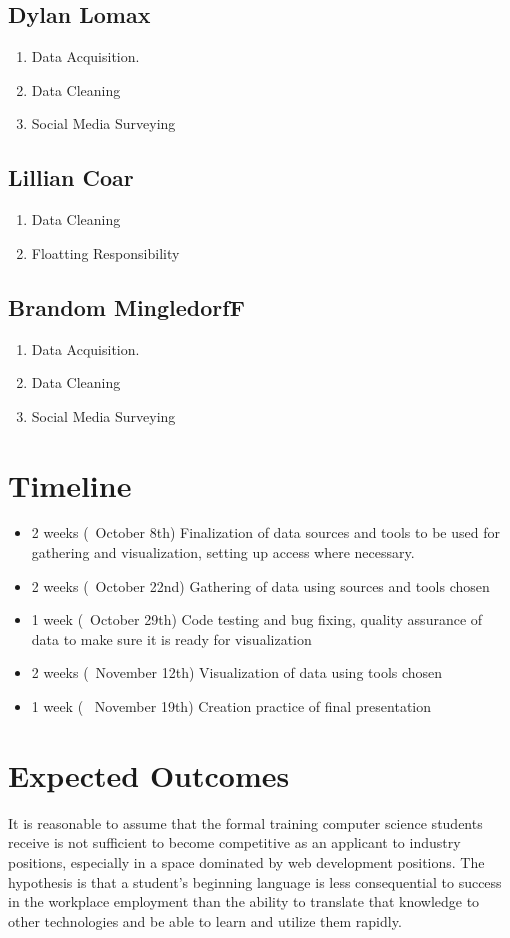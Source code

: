 \documentclass[letterpaper, 10 pt, conference]{ieeeconf}  %
\begin{document}
\subsection{Dylan Lomax}
\begin{enumerate}
    \item Data Acquisition.
    \item Data Cleaning
    \item Social Media Surveying
\end{enumerate}

\subsection{Lillian Coar}
\begin{enumerate}
    \item Data Cleaning
    \item Floatting Responsibility
\end{enumerate}

\subsection{Brandom MingledorfF}
\begin{enumerate}
    \item Data Acquisition.
    \item Data Cleaning
    \item Social Media Surveying
\end{enumerate}

\section{Timeline}

\begin{itemize}
    \item 2 weeks (~October 8th)
    Finalization of data sources and tools to be used for gathering and visualization, setting up access where necessary.
    \item 2 weeks (~October 22nd)
    Gathering of data using sources and tools chosen 
    \item 1 week (~October 29th)
    Code testing and bug fixing, quality assurance of data to make sure it is ready for visualization 
    \item 2 weeks (~November 12th)
    Visualization of data using tools chosen
    \item 1 week ( ~November 19th)
    Creation practice of final presentation
\end{itemize}

\section{Expected Outcomes}

It is reasonable to assume that the formal training computer science students receive is not sufficient to become competitive as an applicant to industry positions, especially in a space dominated by web development positions. The hypothesis is that a student's beginning language is less consequential to success in the workplace employment than the ability to translate that knowledge to other technologies and be able to learn and utilize them rapidly. 
\end{document}
